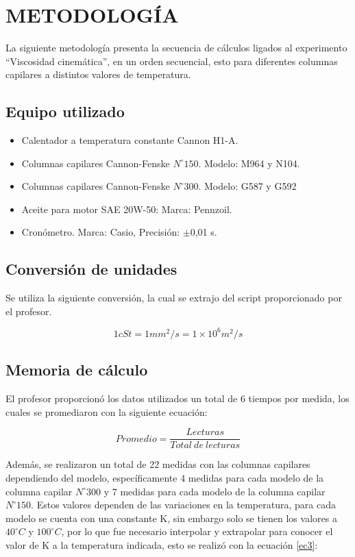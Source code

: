\documentclass[12pt, letterpaper]{article}
\begin{document}
\section{METODOLOGÍA}

La siguiente metodología presenta la secuencia de cálculos ligados al experimento “Viscosidad cinemática”, en un orden secuencial, esto para diferentes columnas capilares a distintos valores de temperatura.

\subsection{Equipo utilizado}
\begin{itemize}
    \item Calentador a temperatura constante Cannon H1-A.
    \item Columnas capilares Cannon-Fenske $N^{\circ}150$. Modelo: M964 y N104.
    \item Columnas capilares Cannon-Fenske $N^{\circ}300$. Modelo: G587 y G592
    \item Aceite para motor SAE 20W-50: Marca: Pennzoil.
    \item Cronómetro. Marca: Casio, Precisión: $\pm$0,01 s.
\end{itemize}

\subsection{Conversión de unidades}
Se utiliza la siguiente conversión, la cual se extrajo del script proporcionado por el profesor.

\begin{equation}
\label{ec1}
1 cSt = 1 mm^{2}/s = 1\times10^{6} m^{2}/s
\end{equation}

\subsection{Memoria de cálculo}

El profesor proporcionó los datos utilizados un total de 6 tiempos por medida, los cuales se promediaron con la siguiente ecuación:

\begin{equation}
\label{ec2}
Promedio = \frac{Lecturas}{Total \> de \> lecturas}
\end{equation}

Además, se realizaron un total de 22 medidas con las columnas capilares dependiendo del modelo, específicamente 4 medidas para cada modelo de la columna capilar $N^{\circ}300$ y 7 medidas para cada modelo de la columna capilar $N^{\circ}150$. Estos valores dependen de las variaciones en la temperatura, para cada modelo se cuenta con una constante K, sin embargo solo se tienen los valores a $40^{\circ}C$ y $100^{\circ}C$, por lo que fue necesario interpolar y extrapolar para conocer el valor de K a la temperatura indicada, esto se realizó con la ecuación \ref{ec3}:
\end{document}
